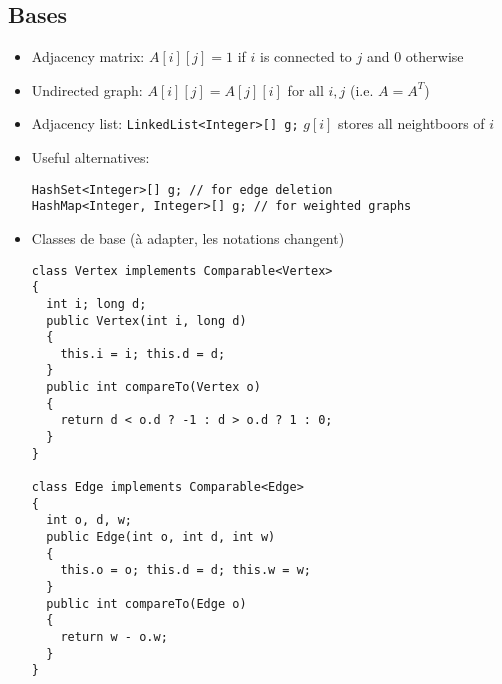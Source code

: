 \subsection{Bases}
\begin{itemize}
\item Adjacency matrix: $A[i][j] = 1$ if $i$ is connected to $j$ and $0$ otherwise
\item Undirected graph: $A[i][j] = A[j][i]$ for all $i,j$ (i.e. $A = A^T$)
\item Adjacency list: \lstinline|LinkedList<Integer>[] g;|
$g[i]$ stores all neightboors of $i$
\item Useful alternatives: 
\begin{lstlisting}
HashSet<Integer>[] g; // for edge deletion
HashMap<Integer, Integer>[] g; // for weighted graphs
\end{lstlisting}
\item Classes de base (à adapter, les notations changent)
\begin{lstlisting}
class Vertex implements Comparable<Vertex>
{
  int i; long d;
  public Vertex(int i, long d)
  {
    this.i = i; this.d = d;
  }
  public int compareTo(Vertex o)
  {
    return d < o.d ? -1 : d > o.d ? 1 : 0;
  }
}

class Edge implements Comparable<Edge>
{
  int o, d, w;
  public Edge(int o, int d, int w)
  {
    this.o = o; this.d = d; this.w = w;
  }
  public int compareTo(Edge o)
  {
    return w - o.w;
  }
}
\end{lstlisting}
\end{itemize}